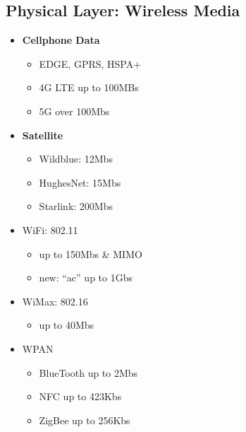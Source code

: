 \documentclass{report}
\begin{document}
\subsection{Physical Layer: Wireless Media}
\begin{minipage}{0.5\textwidth}
\begin{itemize}
  \item \textbf{Cellphone Data}
    \begin{itemize}[label=$\circ$]
      \item EDGE, GPRS, HSPA+
      \item 4G LTE up to 100MBs
      \item 5G over 100Mbs
    \end{itemize}
  \item \textbf{Satellite}
    \begin{itemize}[label=$\circ$]
      \item Wildblue: 12Mbs
      \item HughesNet: 15Mbs
      \item Starlink: 200Mbs
    \end{itemize}
\end{itemize}
\end{minipage}
\begin{minipage}{0.5\textwidth}
\begin{itemize}
  \item WiFi: 802.11
    \begin{itemize}[label=$\circ$]
      \item up to 150Mbs \& MIMO
      \item new: ``ac'' up to 1Gbs
    \end{itemize}
  \item WiMax: 802.16
    \begin{itemize}[label=$\circ$]
      \item up to 40Mbs
    \end{itemize}
  \item WPAN
    \begin{itemize}[label=$\circ$]
      \item BlueTooth up to 2Mbs
      \item NFC up to 423Kbs
      \item ZigBee up to 256Kbs
    \end{itemize}
\end{itemize}	
\end{minipage}
\newpage
\end{document}
